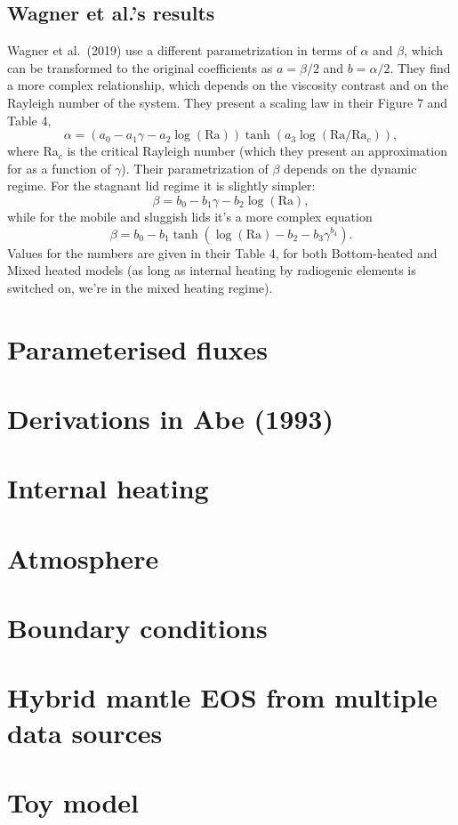 \documentclass[12pt,notitlepage]{article}
\begin{document}
\subsection{Wagner et al.'s results}
Wagner et al.\ (2019) use a different parametrization in terms of $\alpha$ and $\beta$, which can be transformed to the original coefficients as $a = \beta/2$ and $b=\alpha/2$. They find a more complex relationship, which depends on the viscosity contrast and on the Rayleigh number of the system. They present a scaling law in their Figure 7 and Table 4,
\begin{equation}
\alpha = \left( a_0 - a_1 \gamma - a_2 \log(\text{Ra}) \right) \tanh \left( a_3 \log (\text{Ra}/\text{Ra}_c) \right),
\end{equation}
where Ra$_c$ is the critical Rayleigh number (which they present an approximation for as a function of $\gamma$). Their parametrization of $\beta$ depends on the dynamic regime. For the stagnant lid regime it is slightly simpler:
\begin{equation}
\beta = b_0 - b_1 \gamma - b_2 \log (\text{Ra}),
\end{equation}
while for the mobile and sluggish lids it's a more complex equation
\begin{equation}
\beta = b_0 - b_1  \tanh \left( \log(\text{Ra}) - b_2 - b_3 \gamma^{b_4} \right).
\end{equation}
Values for the numbers are given in their Table 4, for both Bottom-heated and Mixed heated models (as long as internal heating by radiogenic elements is switched on, we're in the mixed heating regime).

\section{Parameterised fluxes}


\section{Derivations in Abe (1993)}


\section{Internal heating}


\section{Atmosphere}


\section{Boundary conditions}


\section{Hybrid mantle EOS from multiple data sources}


\section{Toy model}


\appendix




\end{document}
